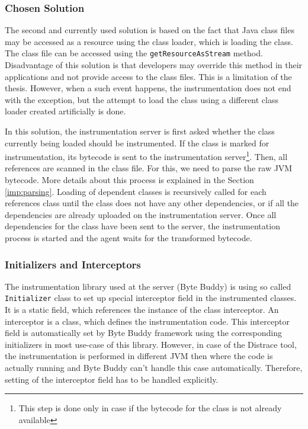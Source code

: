 \subsubsection{Chosen Solution}
The second and currently used solution is based on the fact that Java class files may be accessed as a resource using the class loader, which is loading the class. The class file can be accessed using the \texttt{getResourceAsStream} method. Disadvantage of this solution is that developers may override this method in their applications and not provide access to the class files. This is a limitation of the thesis. However, when a such event happens, the instrumentation does not end with the exception, but the attempt to load the class using a different class loader created artificially is done. 

In this solution, the instrumentation server is first asked whether the class currently being loaded should be instrumented. If the class is marked for instrumentation, its bytecode is sent to the instrumentation server\footnote{This step is done only in case if the bytecode for the class is not already available}. Then, all references are scanned in the class file. For this, we need to parse the raw JVM bytecode. More details about this process is explained in the Section \ref{imp:parsing}. Loading of dependent classes is recursively called for each references class until the class does not have any other dependencies, or if all the dependencies are already uploaded on the instrumentation server. Once all dependencies for the class have been sent to the server, the instrumentation process is started and the agent waits for the transformed bytecode. 

\subsubsection{Initializers and Interceptors}
The instrumentation library used at the server (Byte Buddy) is using so called \texttt{Initializer} class to set up special interceptor field in the instrumented classes. It is a static field, which references the instance of the class interceptor. An interceptor is a class, which defines the instrumentation code. This interceptor field is automatically set by Byte Buddy framework using the corresponding initializers in most use-case of this library. However, in case of the Distrace tool, the instrumentation is performed in different JVM then where the code is actually running and Byte Buddy can't handle this case automatically. Therefore, setting of the interceptor field has to be handled explicitly.

